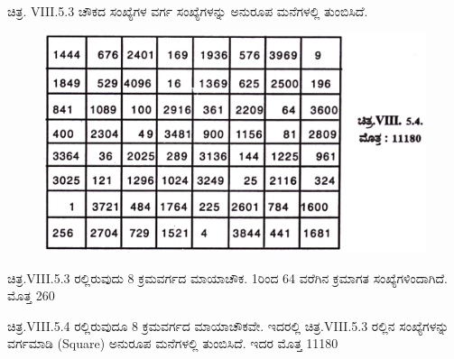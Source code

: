 ಚಿತ್ರ. VIII.5.3 ಚೌಕದ ಸಂಖ್ಯೆಗಳ ವರ್ಗ ಸಂಖ್ಯೆಗಳನ್ನು ಅನುರೂಪ ಮನೆಗಳಲ್ಲಿ \break ತುಂಬಿಸಿದೆ.
\begin{figure}[H]
\includegraphics{src/figures/chap7/fig7-18.jpg}
\end{figure}

ಚಿತ್ರ.VIII.5.3 ರಲ್ಲಿರುವುದು 8 ಕ್ರಮವರ್ಗದ ಮಾಯಾಚೌಕ. 1ರಿಂದ 64 ವರೆಗಿನ ಕ್ರಮಾಗತ ಸಂಖ್ಯೆಗಳಿಂದಾಗಿದೆ. ಮೊತ್ತ 260

ಚಿತ್ರ.VIII.5.4 ರಲ್ಲಿರುವುದೂ 8 ಕ್ರಮವರ್ಗದ ಮಾಯಾಚೌಕವೇ. ಇದರಲ್ಲಿ ಚಿತ್ರ.VIII.5.3 ರಲ್ಲಿನ ಸಂಖ್ಯೆಗಳನ್ನು ವರ್ಗಮಾಡಿ (Square) ಅನುರೂಪ ಮನೆಗಳಲ್ಲಿ ತುಂಬಿಸಿದೆ. ಇದರ ಮೊತ್ತ 11180

